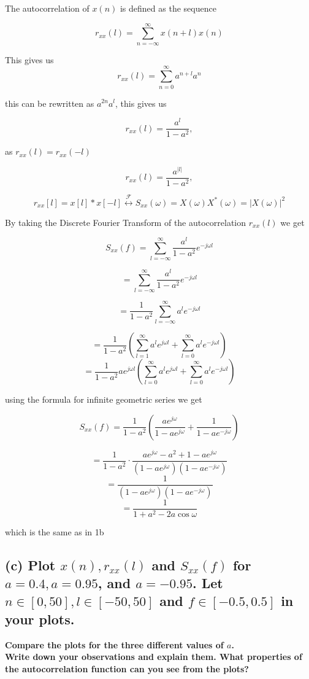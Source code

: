 The autocorrelation of $x(n)$ is defined as the sequence

$$
r_{x x}(l)=\sum_{n=-\infty}^{\infty} x(n+l) x(n)
$$

This gives us 
$$
r_{x x}(l)=\sum_{n=0}^{\infty} a^{n+l} a^n
$$

this can be rewritten as $a^{2n}a^l$, this gives us 

$$
r_{x x}(l)=\frac{a^l}{1-a^{2}}, 
$$

as $r_{x x}(l)=r_{x x}(-l)$

$$
r_{x x}(l)=\frac{a^{|l|}}{1-a^{2}},
$$

$$
r_{x x}[l]=x[l] * x[-l] \stackrel{\mathcal{F}}{\leftrightarrow} S_{x x}(\omega)=X(\omega) X^*(\omega)=|X(\omega)|^2
$$

By taking the Discrete Fourier Transform of the autocorrelation $r_{x x}(l)$ we get 

$$S_{xx}(f)=\sum_{l=-\infty}^{\infty}\frac{a^l}{1-a^{2}}e^{-j\omega l}$$

$$=\sum_{l=-\infty}^{\infty}\frac{a^l}{1-a^{2}}e^{-j\omega l}$$

$$=\frac{1}{1-a^{2}}\sum_{l=-\infty}^{\infty}a^{l}e^{-j\omega l}$$

$$=\frac{1}{1-a^2}\left(\sum_{l=1}^{\infty} a^l e^{j \omega l}+\sum_{l=0}^{\infty} a^l e^{-j \omega l}\right)$$
$$=\frac{1}{1-a^2}ae^{j\omega l}\left(\sum_{l=0}^{\infty} a^l e^{j \omega l}+\sum_{l=0}^{\infty} a^l e^{-j \omega l}\right)$$

using the formula for infinite geometric series we get

$$S_{xx}(f)=\frac{1}{1-a^2}\left(\frac{a e^{j \omega}}{1-a e^{j \omega}}+\frac{1}{1-a e^{-j \omega}}\right)$$

$$=\frac{1}{1-a^2} \cdot \frac{a e^{j \omega}-a^2+1-a e^{j \omega}}{\left(1-a e^{j \omega}\right)\left(1-a e^{-j \omega}\right)} $$
$$=\frac{1}{\left(1-a e^{j \omega}\right)\left(1-a e^{-j \omega}\right)} $$
$$=\frac{1}{1+a^2-2 a \cos \omega}$$

which is the same as in 1b

\subsection*{(c) Plot $x(n), r_{x x}(l)$ and $S_{x x}(f)$ for $a=0.4, a=0.95$, and $a=-0.95$. Let $n \in[0,50], l \in[-50,50]$ and $f \in[-0.5,0.5]$ in your plots.}
\textbf{Compare the plots for the three different values of $a$. \\ Write down your observations and explain them.
What properties of the autocorrelation function can you see from the plots?}

